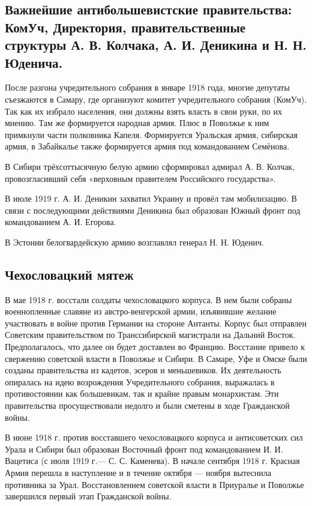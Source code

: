\subsection{Важнейшие антибольшевистские правительства: КомУч, Директория, правительственные структуры А. В. Колчака, А. И. Деникина и Н. Н. Юденича.}
После разгона учредительного собрания в январе 1918 года, многие депутаты съезжаются в Самару, где организуют комитет учредительного собрания (КомУч). Так как их избрало населения, они должны взять власть в свои руки, по их мнению. Там же формируется народная армия. Плюс в Поволжье к ним примкнули части полковника Капеля. Формируется Уральская армия, сибирская армия, в Забайкалье также формируется армия под командованием Семёнова. 

В Сибири трёхсоттысячную белую армию сформировал адмирал А. В. Колчак, провозгласивший себя «верховным правителем Российского государства».

В июле 1919 г. А. И. Деникин захватил Украину и провёл там мобилизацию. В связи с последующими действиями Деникина был образован Южный фронт под командованием А. И. Егорова.

В Эстонии белогвардейскую армию возглавлял генерал Н. Н. Юденич.

\subsection{Чехословацкий мятеж}

В мае 1918 г. восстали солдаты чехословацкого корпуса. В нем были собраны
военнопленные славяне из австро-венгерской армии, изъявившие желание участвовать в войне
против Германии на стороне Антанты. Корпус был отправлен Советским правительством по
Транссибирской магистрали на Дальний Восток. Предполагалось, что далее он будет доставлен
во Францию. Восстание привело к свержению советской власти в Поволжье и Сибири. В
Самаре, Уфе и Омске были созданы правительства из кадетов, эсеров и меньшевиков. Их
деятельность опиралась на идею возрождения Учредительного собрания, выражалась в
противостоянии как большевикам, так и крайне правым монархистам. Эти правительства
просуществовали недолго и были сметены в ходе Гражданской войны.

В июне 1918 г. против восставшего чехословацкого корпуса и антисоветских сил Урала и
Сибири был образован Восточный фронт под командованием И. И. Вацетиса (с июля 1919 г.—
С. С. Каменева). В начале сентября 1918 г. Красная Армия перешла в наступление и в течение
октября — ноября вытеснила противника за Урал. Восстановлением советской власти в
Приуралье и Поволжье завершился первый этап Гражданской войны.

